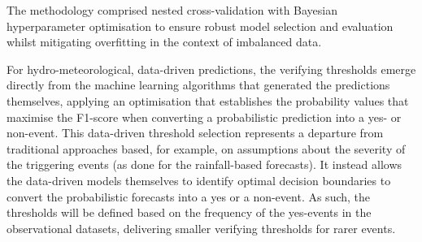 The methodology comprised nested cross-validation with Bayesian hyperparameter optimisation to ensure robust model selection and evaluation whilst mitigating overfitting in the context of imbalanced data. 



















































For hydro-meteorological, data-driven predictions, the verifying thresholds emerge directly from the machine learning algorithms that generated the predictions themselves, applying an optimisation that establishes the probability values that maximise the F1-score when converting a probabilistic prediction into a yes- or non-event. This data-driven threshold selection represents a departure from traditional approaches based, for example, on assumptions about the severity of the triggering events (as done for the rainfall-based forecasts). It instead allows the data-driven models themselves to identify optimal decision boundaries to convert the probabilistic forecasts into a yes or a non-event. As such, the thresholds will be defined based on the frequency of the yes-events in the observational datasets, delivering smaller verifying thresholds for rarer events. 


